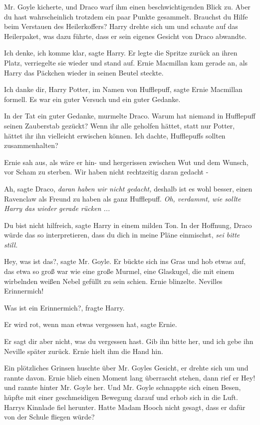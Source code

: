 Mr. Goyle kicherte, und Draco warf ihm einen beschwichtigenden Blick zu. \glqq{}
Aber du hast wahrscheinlich trotzdem ein paar Punkte gesammelt. Brauchst du
Hilfe beim Verstauen des Heilerkoffers?\grqq{} Harry drehte sich um und schaute
auf das Heilerpaket, was dazu führte, dass er sein eigenes Gesicht von Draco
abwandte.

\glqq{}Ich denke, ich komme klar\grqq{}, sagte Harry. Er legte die Spritze zurück
an ihren Platz, verriegelte sie wieder und stand auf. Ernie Macmillan kam gerade
an, als Harry das Päckchen wieder in seinen Beutel steckte.

\glqq{}Ich danke dir, Harry Potter, im Namen von Hufflepuff\grqq{}, sagte Ernie
Macmillan formell. \glqq{}Es war ein guter Versuch und ein guter Gedanke.\grqq{}

\glqq{}In der Tat ein guter Gedanke\grqq{}, murmelte Draco. \glqq{}Warum hat
niemand in Hufflepuff seinen Zauberstab gezückt? Wenn ihr alle geholfen hättet,
statt nur Potter, hättet ihr ihn vielleicht erwischen können. Ich dachte,
Hufflepuffs sollten zusammenhalten?\grqq{}

Ernie sah aus, als wäre er hin- und hergerissen zwischen Wut und dem Wunsch, vor
Scham zu sterben. \glqq{}Wir haben nicht rechtzeitig daran gedacht -\grqq{}

\glqq{}Ah\grqq{}, sagte Draco, \glqq{}\emph{daran haben wir nicht gedacht,}
deshalb ist es wohl besser, einen Ravenclaw als Freund zu haben als ganz
Hufflepuff.\grqq{} \emph{Oh, verdammt, wie sollte Harry das wieder gerade
rücken ...}

\glqq{}Du bist nicht hilfreich\grqq{}, sagte Harry in einem milden Ton. In der
Hoffnung, Draco würde das so interpretieren, dass du dich in meine Pläne
einmischst, \emph{sei bitte still.}

\glqq{}Hey, was ist das?\grqq{}, sagte Mr. Goyle. Er bückte sich ins Gras und hob
etwas auf, das etwa so groß war wie eine große Murmel, eine Glaskugel, die mit
einem wirbelnden weißen Nebel gefüllt zu sein schien. Ernie blinzelte. \glqq{}
Nevilles Erinnermich!\grqq{}

\glqq{}Was ist ein Erinnermich?\grqq{}, fragte Harry.

\glqq{}Er wird rot, wenn man etwas vergessen hat\grqq{}, sagte Ernie.

\glqq{}Er sagt dir aber nicht, was du vergessen hast. Gib ihn bitte her, und ich
gebe ihn Neville später zurück.\grqq{} Ernie hielt ihm die Hand hin.

Ein plötzliches Grinsen huschte über Mr. Goyles Gesicht, er drehte sich um und
rannte davon. Ernie blieb einen Moment lang überrascht stehen, dann rief er
\glqq{}Hey!\grqq{} und rannte hinter Mr. Goyle her. Und Mr. Goyle schnappte sich
einen Besen, hüpfte mit einer geschmeidigen Bewegung darauf und erhob sich in
die Luft. Harrys Kinnlade fiel herunter. Hatte Madam Hooch nicht gesagt, dass er
dafür von der Schule fliegen würde?

